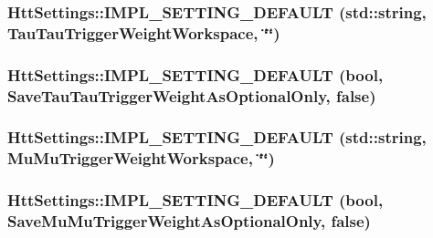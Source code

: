 \hypertarget{classHttSettings_a6cacd94282f306dcc378783dae8f193f}{
\subsubsection[{IMPL\_\-SETTING\_\-DEFAULT}]{\setlength{\rightskip}{0pt plus 5cm}HttSettings::IMPL\_\-SETTING\_\-DEFAULT (std::string, \/  TauTauTriggerWeightWorkspace, \/  \char`\"{}\char`\"{})}}
\label{classHttSettings_a6cacd94282f306dcc378783dae8f193f}
\hypertarget{classHttSettings_af06ee6db5e66d375f02cdb462ad0109a}{
\subsubsection[{IMPL\_\-SETTING\_\-DEFAULT}]{\setlength{\rightskip}{0pt plus 5cm}HttSettings::IMPL\_\-SETTING\_\-DEFAULT (bool, \/  SaveTauTauTriggerWeightAsOptionalOnly, \/  false)}}
\label{classHttSettings_af06ee6db5e66d375f02cdb462ad0109a}
\hypertarget{classHttSettings_abf46321a9b0e9b722230dee789746fe7}{
\subsubsection[{IMPL\_\-SETTING\_\-DEFAULT}]{\setlength{\rightskip}{0pt plus 5cm}HttSettings::IMPL\_\-SETTING\_\-DEFAULT (std::string, \/  MuMuTriggerWeightWorkspace, \/  \char`\"{}\char`\"{})}}
\label{classHttSettings_abf46321a9b0e9b722230dee789746fe7}
\hypertarget{classHttSettings_a0477d9837718fbff577da0e7c46e1727}{
\subsubsection[{IMPL\_\-SETTING\_\-DEFAULT}]{\setlength{\rightskip}{0pt plus 5cm}HttSettings::IMPL\_\-SETTING\_\-DEFAULT (bool, \/  SaveMuMuTriggerWeightAsOptionalOnly, \/  false)}}
\label{classHttSettings_a0477d9837718fbff577da0e7c46e1727}
